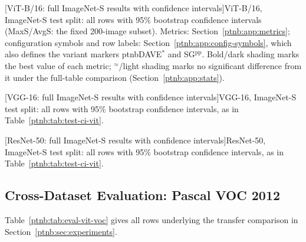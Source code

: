 \begin{center}
    \captionsetup{hypcap=false}
    [ViT-B/16: full ImageNet-S results with confidence intervals]{ViT-B/16, ImageNet-S test split: all rows with 95\% bootstrap confidence
    intervals (MaxS/AvgS: the fixed 200-image subset). Metrics: Section~\ref{ptnb:app:metrics}; configuration symbols and row labels:
    Section~\ref{ptnb:app:config-symbols}, which also defines the variant markers \acs{ptnbDAVE}$^{*}$ and SG$^{\mathrm{pp}}$. Bold/dark shading marks the best value of each metric; $^{\approx}$/light shading marks no significant difference from it under the full-table comparison (Section~\ref{ptnb:app:stats}).}
    \label{ptnb:tab:test-ci-vit}
\end{center}
\captionsetup{hypcap=true}

\begin{center}
    \captionsetup{hypcap=false}
    [VGG-16: full ImageNet-S results with confidence intervals]{VGG-16, ImageNet-S test split: all rows with 95\% bootstrap confidence intervals,
    as in Table~\ref{ptnb:tab:test-ci-vit}.}
    \label{ptnb:tab:test-ci-vgg}
\end{center}
\captionsetup{hypcap=true}

\begin{center}
    \captionsetup{hypcap=false}
    [ResNet-50: full ImageNet-S results with confidence intervals]{ResNet-50, ImageNet-S test split: all rows with 95\% bootstrap confidence
    intervals, as in Table~\ref{ptnb:tab:test-ci-vit}.}
    \label{ptnb:tab:test-ci-resnet}
\end{center}
\captionsetup{hypcap=true}

\subsection{Cross-Dataset Evaluation: Pascal VOC 2012}\label{ptnb:app:voc-cross-data}\label{app:voc-cross-data}
Table~\ref{ptnb:tab:eval-vit-voc} gives all rows underlying the transfer comparison in Section~\ref{ptnb:sec:experiments}.

